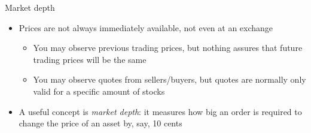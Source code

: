 \documentclass[english,10pt]{beamer}
\theoremstyle{definition}
\begin{document}
\begin{frame}{Market depth}
\begin{itemize}
\item Prices are not always immediately available, not even at an exchange
\begin{itemize}
\item You may observe previous trading prices, but nothing assures that future trading prices will be the same
\item You may observe quotes from sellers/buyers, but quotes are normally only valid for a specific amount of stocks
\end{itemize}


\item A useful concept is \textit{market depth}: it measures how big an order is required to change the price of an asset by, say, 10 cents

\end{itemize}

\end{frame}
\end{document}
